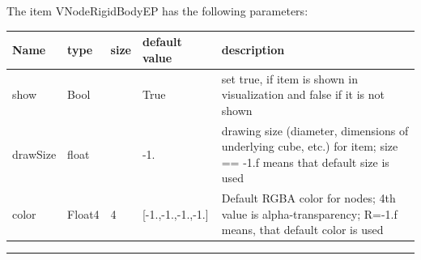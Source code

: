 The item VNodeRigidBodyEP has the following parameters:\vspace{-1cm}\\ 
\begin{center}
  \footnotesize
  \begin{longtable}{| p{4.5cm} | p{2.5cm} | p{0.5cm} | p{2.5cm} | p{6cm} |}
    \hline
    \bf Name & \bf type & \bf size & \bf default value & \bf description \\ \hline
    show &     Bool &      &     True &     set true, if item is shown in visualization and false if it is not shown\\ \hline
    drawSize &     float &      &     -1. &     drawing size (diameter, dimensions of underlying cube, etc.)  for item; size == -1.f means that default size is used\\ \hline
    color &     Float4 &     4 &     [-1.,-1.,-1.,-1.] &     Default RGBA color for nodes; 4th value is alpha-transparency; R=-1.f means, that default color is used\\ \hline
	  \end{longtable}
	\end{center}
\par\noindent\rule{\textwidth}{0.4pt}
\label{description_NodeRigidBodyEP}

